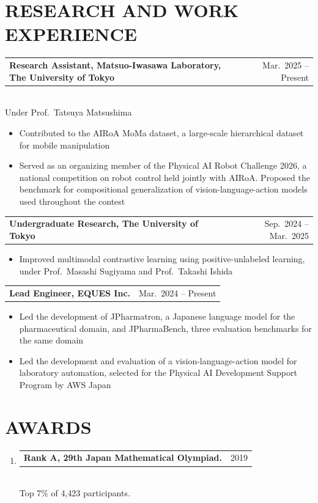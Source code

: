 \documentclass[11pt,a4paper]{article}
\makeatletter
\newcommand{\entry}[2]{%
  \noindent\begin{tabularx}{\linewidth}{@{}Xr@{}}#1 & #2\end{tabularx}%
}
\makeatother
\begin{document}
\section{RESEARCH AND WORK EXPERIENCE}

\entry{\textbf{Research Assistant, Matsuo-Iwasawa Laboratory, The University of Tokyo}}{Mar.\ 2025 -- Present}\\
Under Prof.\ Tatsuya Matsushima
\begin{itemize}
	\item Contributed to the AIRoA MoMa dataset, a large-scale hierarchical dataset for mobile manipulation
	\item Served as an organizing member of the Physical AI Robot Challenge 2026, a national competition on robot
	      control held jointly with AIRoA. Proposed the benchmark for compositional generalization of
	      vision-language-action models used throughout the contest
\end{itemize}

\medskip
\entry{\textbf{Undergraduate Research, The University of Tokyo}}{Sep.\ 2024 -- Mar.\ 2025}
\begin{itemize}
	\item Improved multimodal contrastive learning using positive-unlabeled learning, under Prof.\ Masashi Sugiyama
	      and Prof.\ Takashi Ishida
\end{itemize}

\medskip
\entry{\textbf{Lead Engineer, EQUES Inc.}}{Mar.\ 2024 -- Present}
\begin{itemize}
	\item Led the development of JPharmatron, a Japanese language model for the pharmaceutical domain, and
	      JPharmaBench, three evaluation benchmarks for the same domain
	\item Led the development and evaluation of a vision-language-action model for laboratory automation, selected
	      for the Physical AI Development Support Program by AWS Japan
\end{itemize}

\section{AWARDS}
\begin{enumerate}[leftmargin=2em]
	\item \entry{\textbf{Rank A, 29th Japan Mathematical Olympiad.}}{2019}\\
	      Top 7\% of 4{,}423 participants.
\end{enumerate}
\end{document}

